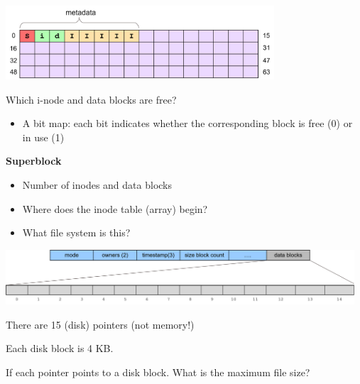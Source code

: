 \begin{slide}


    \includegraphics[width=100mm]{VSFS-3.png}
    \bigskip

    Which i-node and data blocks are free?
    \begin{itemize}
        \item A bit map: each bit indicates whether the corresponding block is free (0) or in use (1)
    \end{itemize}
    \bigskip

    \textbf{Superblock}
    \begin{itemize}
        \item Number of inodes and data blocks
        \item Where does the inode table (array) begin?
        \item What file system is this?
    \end{itemize}

\end{slide}

\begin{slide}

    
    \medskip
    \includegraphics[width=130mm]{inode-struct.png}
    \bigskip

    There are 15 (disk) pointers (not memory!)
    \bigskip

    Each disk block is 4 KB.
    \bigskip

    If each pointer points to a disk block. What is the maximum file size?
\end{slide}


